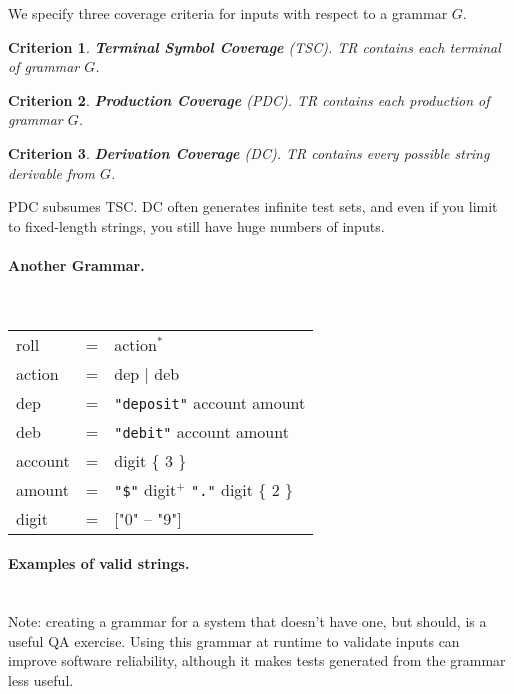 \documentclass[11pt]{article}
\newtheorem{crit}{Criterion}
\begin{document}
We specify three coverage criteria for inputs with respect to a grammar $G$.
\begin{crit}
{\bf Terminal Symbol Coverage} (TSC). TR contains each terminal of grammar $G$.
\end{crit}
\begin{crit}
{\bf Production Coverage} (PDC). TR contains each production of grammar $G$.
\end{crit}
\begin{crit}
{\bf Derivation Coverage} (DC). TR contains every possible string derivable
from $G$.
\end{crit}
PDC subsumes TSC. DC often generates infinite test sets, and even if
you limit to fixed-length strings, you still have huge numbers of inputs.


\paragraph{Another Grammar.}~\\

{\sf 
\begin{tabular}{lcl}
roll &=& action$^*$ \\
action &=& dep $\mid$ deb \\
dep &=& {\tt "deposit"} account amount \\
deb &=& {\tt "debit"} account amount \\
account &=& digit \{ 3 \} \\
amount &=& {\tt "\$"} digit$^+$ {\tt "."} digit \{ 2 \} \\
digit &=& ["0" -- "9"]
\end{tabular}
}

\paragraph{Examples of valid strings.}~\\[4em]

Note: creating a grammar for a system that doesn't have one, but should,
is a useful QA exercise. Using this grammar at runtime to validate inputs
can improve software reliability, although it makes tests generated
from the grammar less useful.
\end{document}
